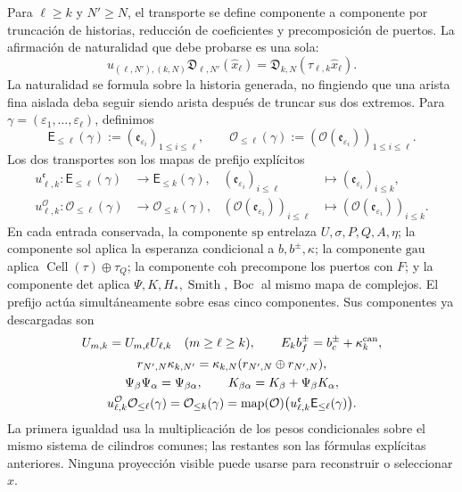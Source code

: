 Para \(\ell\geq k\) y \(N'\geq N\), el transporte se define componente a
componente por truncación de historias, reducción de coeficientes y
precomposición de puertos. La afirmación de naturalidad que debe probarse es
una sola:
\begin{equation}
\label{rm:eq:pdfv2-cor-naturalidad-unica}
 u_{(\ell,N'),(k,N)}\mathfrak D_{\ell,N'}(\widehat x_\ell)
 =\mathfrak D_{k,N}(\tau_{\ell,k}\widehat x_\ell).
\end{equation}
La naturalidad se formula sobre la historia generada, no fingiendo que una
arista fina aislada deba seguir siendo arista después de truncar sus dos
extremos. Para
\(\gamma=(\varepsilon_1,\ldots,\varepsilon_\ell)\), definimos
\[
 \mathsf E_{\leq\ell}(\gamma)
 :=(\mathfrak e_{\varepsilon_i})_{1\leq i\leq\ell},
 \qquad
 \mathcal O_{\leq\ell}(\gamma)
 :=(\mathcal O(\mathfrak e_{\varepsilon_i}))_{1\leq i\leq\ell}.
\]
Los dos transportes son los mapas de prefijo explícitos
\begin{align}
 u^{\mathfrak e}_{\ell,k}:
 \mathsf E_{\leq\ell}(\gamma)&\longrightarrow
 \mathsf E_{\leq k}(\gamma),&
 (\mathfrak e_{\varepsilon_i})_{i\leq\ell}
 &\longmapsto(\mathfrak e_{\varepsilon_i})_{i\leq k},
 \label{rm:eq:pdfv2-cor-transporte-arista}\\
 u^{\mathcal O}_{\ell,k}:
 \mathcal O_{\leq\ell}(\gamma)&\longrightarrow
 \mathcal O_{\leq k}(\gamma),&
 (\mathcal O(\mathfrak e_{\varepsilon_i}))_{i\leq\ell}
 &\longmapsto
 (\mathcal O(\mathfrak e_{\varepsilon_i}))_{i\leq k}.
 \label{rm:eq:pdfv2-cor-transporte-accion}
\end{align}
En cada entrada conservada, la componente \(\mathrm{sp}\) entrelaza
\(U,\sigma,P,Q,A,\eta\); la componente \(\mathrm{sol}\) aplica la esperanza
condicional a \(b,b^\pm,\kappa\); la componente \(\mathrm{gau}\) aplica
\(\operatorname{Cell}(\tau)\oplus\tau_Q\); la componente \(\mathrm{coh}\)
precompone los puertos con \(F\); y la componente \(\mathrm{det}\) aplica
\(\Psi,K,H_*,\operatorname{Smith},\operatorname{Boc}\) al mismo mapa de
complejos. El prefijo actúa simultáneamente sobre esas cinco componentes.
Sus componentes ya descargadas son
\begin{equation}
\label{rm:eq:pdfv2-cor-naturalidad-componentes}
 \begin{gathered}
 U_{m,k}=U_{m,\ell}U_{\ell,k}\quad(m\geq\ell\geq k),\qquad
 E_kb_f^\pm=b_c^\pm+\kappa_k^{\rm can},\\
 r_{N',N}\kappa_{k,N'}=
 \kappa_{k,N}(r_{N',N}\oplus r_{N',N}),\\
 \Psi_\beta\Psi_\alpha=\Psi_{\beta\alpha},
 \qquad K_{\beta\alpha}=K_\beta+\Psi_\beta K_\alpha,\\
 u^{\mathcal O}_{\ell,k}\mathcal O_{\leq\ell}(\gamma)
 =\mathcal O_{\leq k}(\gamma)
 =\operatorname{map}(\mathcal O)\bigl(u^{\mathfrak e}_{\ell,k}
                    \mathsf E_{\leq\ell}(\gamma)\bigr).
 \end{gathered}
\end{equation}
La primera igualdad usa la multiplicación de los pesos condicionales sobre el mismo
sistema de cilindros comunes; las restantes son las fórmulas explícitas
anteriores. Ninguna proyección visible
puede usarse para reconstruir o seleccionar \(\widehat x\).

